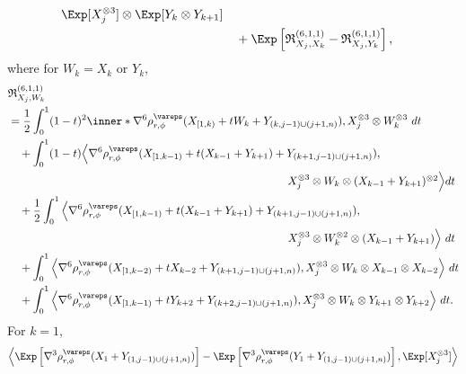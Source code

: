 \documentclass[aos]{imsart}
\begin{document}
\begin{appendix}
\begin{equation*}
\begin{aligned}
{        \Exp[ X_j^{\otimes 3} ] \otimes \Exp[ Y_k \otimes Y_{k+1} ]
    } \\
    & \quad + \Exp\left[ \mathfrak{R}_{X_j,X_k}^{(6,1,1)} - \mathfrak{R}_{X_j,Y_k}^{(6,1,1)} \right], \\
\end{aligned}
\end{equation*}
where for $W_k = X_k$ or $Y_k$,
\begin{equation} \label{eq:R_6_1}
\begin{aligned}
    & \mathfrak{R}_{X_j,W_k}^{(6,1,1)} \\
    & = \frac{1}{2} \int_0^1 (1-t)^2 \inner*{
        \nabla^6 \rho_{r,\phi}^\vareps(X_{[1,k)} + t W_k + Y_{(k,j-1) \cup (j+1,n)}) ,
        X_j^{\otimes 3} \otimes W_k^{\otimes 3}
    } ~dt \\
    & \quad + \int_0^1 (1-t) \Big\langle
        \nabla^6 \rho_{r,\phi}^\vareps(X_{[1,k-1)} + t (X_{k-1} + Y_{k+1}) + Y_{(k+1,j-1) \cup (j+1,n)}), \\
    & \omit{\hfill $X_j^{\otimes 3} \otimes W_k \otimes (X_{k-1} + Y_{k+1})^{\otimes 2}
    \Big\rangle dt$} \\
    & \quad + \frac{1}{2} \int_0^1 \Big\langle
        \nabla^6 \rho_{r,\phi}^\vareps(X_{[1,k-1)} + t (X_{k-1} + Y_{k+1}) + Y_{(k+1,j-1) \cup (j+1,n)}), \\
    & \omit{\hfill $X_j^{\otimes 3} \otimes W_k^{\otimes 2} \otimes (X_{k-1} + Y_{k+1})
    \Big\rangle ~dt$} \\
    & \quad + \int_0^1 \Big\langle
        \nabla^6 \rho_{r,\phi}^\vareps(X_{[1,k-2)} + t X_{k-2} + Y_{(k+1,j-1) \cup (j+1,n)}), 
        X_j^{\otimes 3} \otimes W_k \otimes X_{k-1} \otimes X_{k-2}
    \Big\rangle ~dt \\
    & \quad + \int_0^1 \Big\langle
        \nabla^6 \rho_{r,\phi}^\vareps(X_{[1,k-1)} + t Y_{k+2} + Y_{(k+2,j-1) \cup (j+1,n)}), 
        X_j^{\otimes 3} \otimes W_k \otimes Y_{k+1} \otimes Y_{k+2}
    \Big\rangle ~dt.
\end{aligned}
\end{equation}
For $k = 1$,
\begin{equation*}
\begin{aligned}
    & \Big\langle
        \Exp\left[ \nabla^3 \rho_{r,\phi}^\vareps(X_1 + Y_{(1,j-1) \cup (j+1,n)}) \right] 
    - \Exp\left[ \nabla^3   \rho_{r,\phi}^\vareps(Y_1 + Y_{(1,j-1) \cup (j+1,n)}) \right], 
        \Exp[ X_j^{\otimes 3} ]
    \Big\rangle \\

\end{aligned}
\end{equation*}
\end{appendix}
\end{document}
